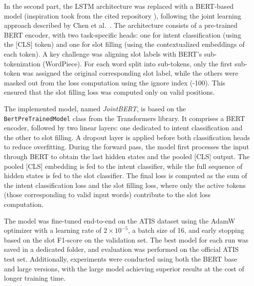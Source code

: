 \documentclass[a4paper]{article}
\begin{document}
 In the second part, the LSTM architecture was replaced with a BERT-based model (inspiration took from the cited repository \cite{JointBERT}), following the joint learning approach described by Chen et al.~\cite{chen2019bertjointintentclassification}.
 The architecture consists of a pre-trained BERT encoder, with two task-specific heads: one for intent classification (using the [CLS] token) and one for slot filling (using the contextualized embeddings of each token).
 A key challenge was aligning slot labels with BERT’s sub-tokenization (WordPiece).
 For each word split into sub-tokens, only the first sub-token was assigned the original corresponding slot label, while the others were masked out from the loss computation using the ignore index (-100).
 This ensured that the slot filling loss was computed only on valid positions.
 
 The implemented model, named \textit{JointBERT}, is based on the \texttt{BertPreTrainedModel} class from the Transformers library.
 It comprises a BERT encoder, followed by two linear layers: one dedicated to intent classification and the other to slot filling.
 A dropout layer is applied before both classification heads to reduce overfitting.
 During the forward pass, the model first processes the input through BERT to obtain the last hidden states and the pooled [CLS] output.
 The pooled [CLS] embedding is fed to the intent classifier, while the full sequence of hidden states is fed to the slot classifier.
 The final loss is computed as the sum of the intent classification loss and the slot filling loss, where only the active tokens (those corresponding to valid input words) contribute to the slot loss computation.
 
 The model was fine-tuned end-to-end on the ATIS dataset using the AdamW optimizer with a learning rate of $2 \times 10^{-5}$, a batch size of 16, and early stopping based on the slot F1-score on the validation set.
 The best model for each run was saved in a dedicated folder, and evaluation was performed on the official ATIS test set.
 Additionally, experiments were conducted using both the BERT base and large versions, with the large model achieving superior results at the cost of longer training time.
\end{document}
